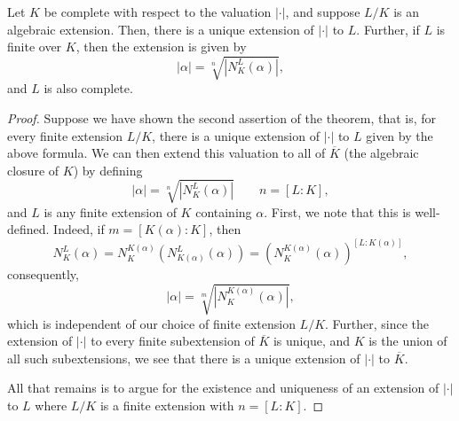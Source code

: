 \begin{theorem}
    Let $K$ be complete with respect to the valuation $|\cdot|$, and suppose $L/K$ is an algebraic extension. Then, there is a unique extension of $|\cdot|$ to $L$. Further, if $L$ is finite over $K$, then the extension is given by 
    \begin{equation*}
        |\alpha| = \sqrt[n]{\left|N^L_K(\alpha)\right|},
    \end{equation*}
    and $L$ is also complete.
\end{theorem}
\begin{proof}
    Suppose we have shown the second assertion of the theorem, that is, for every finite extension $L/K$, there is a unique extension of $|\cdot|$ to $L$ given by the above formula. We can then extend this valuation to all of $\overline K$ (the algebraic closure of $K$) by defining 
    \begin{equation*}
        |\alpha| = \sqrt[n]{\left|N^L_K(\alpha)\right|}\qquad n = [L : K],
    \end{equation*}
    and $L$ is any finite extension of $K$ containing $\alpha$. First, we note that this is well-defined. Indeed, if $m = [K(\alpha): K]$, then 
    \begin{equation*}
        N^L_K(\alpha) = N^{K(\alpha)}_K\left(N^L_{K(\alpha)}(\alpha)\right) = \left(N^{K(\alpha)}_{K}(\alpha)\right)^{[L : K(\alpha)]},
    \end{equation*}
    consequently, 
    \begin{equation*}
        |\alpha| = \sqrt[m]{\left|N^{K(\alpha)}_K(\alpha)\right|},
    \end{equation*}
    which is independent of our choice of finite extension $L/K$. Further, since the extension of $|\cdot|$ to every finite subextension of $\overline K$ is unique, and $K$ is the union of all such subextensions, we see that there is a unique extension of $|\cdot|$ to $\overline K$.

    All that remains is to argue for the existence and uniqueness of an extension of $|\cdot|$ to $L$ where $L/K$ is a finite extension with $n = [L : K]$.


\end{proof}
